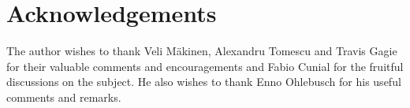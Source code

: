 \documentclass[a4paper]{article}
\begin{document}
\begin{comment}
It is interesting to note that a method that enumerates all suffix tree nodes (in arbitrary order) can 
also be used to solve in linear time most of the problems whose solution needs to traverse all the suffix tree 
nodes, which is faster than the $O(n\log^\epsilon n)$ time 
needed to traverse the compressed suffix tree in natural order (depth first order). 


On the other hand any application that needs to traverse the whole suffix tree in natural order 
will only get a constant-factor speedup from a faster construction algorithm 
(linear instead of $O(n\log^\epsilon n)$ time) 
since the traversal phase still requires $O(n\log^\epsilon n)$ time. 

Maybe the applications that will get most benefit from our faster suffix tree construction are 
those that need to build a data structure that uses 
compressed suffix tree as a component and then answer to queries 
quickly using operations on the compressed suffix tree. 
For such applications the compressed suffix tree is likely to be the bottleneck 
in the construction phase. 
\end{comment}







\section*{Acknowledgements}
The author wishes to thank Veli M\"{a}kinen, Alexandru Tomescu and Travis Gagie for their valuable comments 
and encouragements and Fabio Cunial for the fruitful discussions on the subject. 
He also wishes to thank Enno Ohlebusch for his useful comments and remarks. 




\newpage
\appendix
\end{document}
